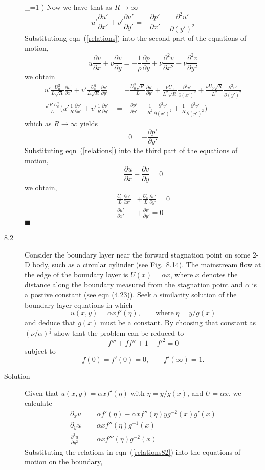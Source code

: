 \documentclass[11pt]{article}
\newcommand{\eq}[1]{\begin{align*}#1\end{align*}}
\newcommand{\eqr}[1]{eqn~(\ref{#1})}
\newcommand{\fp}[2]{\frac{\partial#1}{\partial#2}}
\newcommand{\fpp}[2]{\frac{\partial^2 #1}{\partial#2^2}}
\newcommand{\p}[1]{\partial_{#1}}
\begin{document}
\begin{description}
{{    
  }_{=1}
  \fpp{u'}{(y')}
  \bigg)
}
Now we have that as $R \rightarrow \infty$
$$
  u' \fp{u'}{x'}
  + v' \fp{u'}{y'}
  =
  - \fp{p'}{x'}
  + \fpp{u'}{(y')}
$$
Substitutiong \eqr{relations} into the second part of the equations of motion,
$$
  u \fp{v}{x} + v \fp{v}{y} = -\frac{1}{\rho} \fp{p}{y} + \nu \fpp{v}{x} + \nu \fpp{v}{y}
$$
we obtain
\eq{
  u' \frac{U_0^2}{L\sqrt{R}} \fp{v'}{x'}
  + v' \frac{U_0^2}{L\sqrt{R}} \fp{v'}{y'}
  &=
  -\frac{U_0^2 \sqrt{R}}{L} \fp{p'}{y'}
  + \frac{\nu U_0}{L^2 \sqrt{R}} \fpp{v'}{(x')}
  + \frac{\nu U_0 \sqrt{R}}{L^2} \fpp{v'}{(y')}
  \\
%
%
  \frac{\sqrt{R}U_0^2}{L}\bigg(
  u' \frac{1}{R} \fp{v'}{x'}
  + v' \frac{1}{R} \fp{v'}{y'}
  &=
  -\fp{p'}{y'}
  + \frac{1}{R^2} \fpp{v'}{(x')}
  + \frac{1}{R} \fpp{v'}{(y')}
  \bigg)
}
which as $R \rightarrow \infty$ yields
$$
  0
  =
  - \fp{p'}{y'}
$$
Substituting \eqr{relations} into the third part of the equations of motion,
$$
  \fp{u}{x} + \fp{v}{y} = 0
$$
we obtain,
\eq{
    \frac{U_0}{L} \fp{u'}{x'} &+ \frac{U_0}{L} \fp{v'}{y'} = 0\\
    \fp{u'}{x'} &+ \fp{v'}{y'} = 0
}
%
\hfill $\blacksquare$
\item[8.2] Consider the boundary layer near the forward stagnation point on some
2-D body, such as a circular cylinder (see Fig.~8.14). The mainstream flow at the
edge of the boundary layer is $U(x) = \alpha x$, where $x$ denotes the distance
along the boundary measured from the stagnation point and $\alpha$ is a postive
constant (see eqn (4.23)). Seek a similarity solution of the boundary layer
equations in which
$$
  u(x, y) = \alpha x f'(\eta),
  \qquad
  \text{where} \; \eta = y / g(x)
$$
and deduce that $g(x)$ must be a constant. By choosing that constant as
$(\nu/\alpha)^{\frac{1}{2}}$ show that the problem can be reduced to
$$
  f''' + ff'' + 1 - f'^2 = 0
$$
subject to
$$
  f(0) = f'(0) = 0,
  \qquad
  f'(\infty) = 1.
$$
\item[Solution]
Given that $u(x,y) = \alpha x f'(\eta)$ with $\eta = y/g(x)$, and $U = \alpha x$,
we calculate
\begin{align}
\label{relations82}
\nonumber  \p{x}u &= \alpha f'(\eta) - \alpha xf''(\eta)y g^{-2}(x)g'(x) \\
\nonumber  \p{y}u &= \alpha x f''(\eta) g^{-1}(x) \\
           \fpp{u}{y} &= \alpha x f'''(\eta) g^{-2}(x)
\end{align}
Substituting the relations in \eqr{relations82} into the equations of motion
on the boundary,

\end{description}
\end{document}
